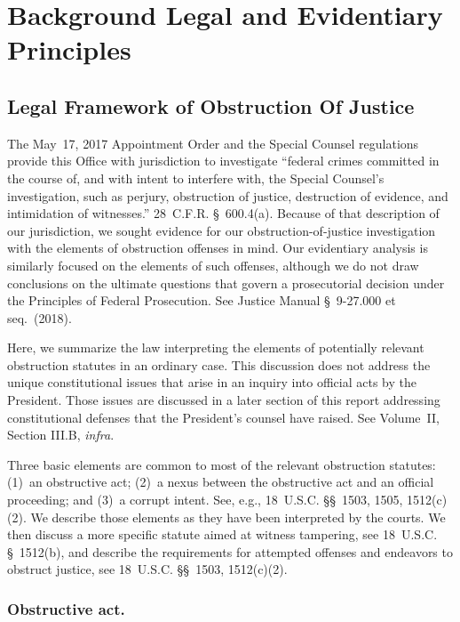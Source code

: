 \section{Background Legal and Evidentiary Principles}

\subsection{Legal Framework of Obstruction Of Justice}

The May~17, 2017 Appointment Order and the Special Counsel regulations provide this Office with jurisdiction to investigate “federal crimes committed in the course of, and with intent to interfere with, the Special Counsel's investigation, such as perjury, obstruction of justice, destruction of evidence, and intimidation of witnesses.”
28~C.F.R. \S~600.4(a).
Because of that description of our jurisdiction, we sought evidence for our obstruction-of-justice investigation with the elements of obstruction offenses in mind.
Our evidentiary analysis is similarly focused on the elements of such offenses, although we do not draw conclusions on the ultimate questions that govern a prosecutorial decision under the Principles of Federal Prosecution.
See Justice Manual \S~9-27.000 et seq.~(2018).

Here, we summarize the law interpreting the elements of potentially relevant obstruction statutes in an ordinary case.
This discussion does not address the unique constitutional issues that arise in an inquiry into official acts by the President.
Those issues are discussed in a later section of this report addressing constitutional defenses that the President’s counsel have raised. See Volume~II, Section III.B, \textit{infra}.

Three basic elements are common to most of the relevant obstruction statutes: (1)~an obstructive act; (2)~a nexus between the obstructive act and an official proceeding; and (3)~a corrupt intent.
See, e.g., 18~U.S.C. \S\S~1503, 1505, 1512(c)(2).
We describe those elements as they have been interpreted by the courts.
We then discuss a more specific statute aimed at witness tampering, see 18~U.S.C. \S~1512(b), and describe the requirements for attempted offenses and endeavors to obstruct justice, see 18~U.S.C. \S\S~1503, 1512(c)(2).

\subsubsection*{Obstructive act.}

